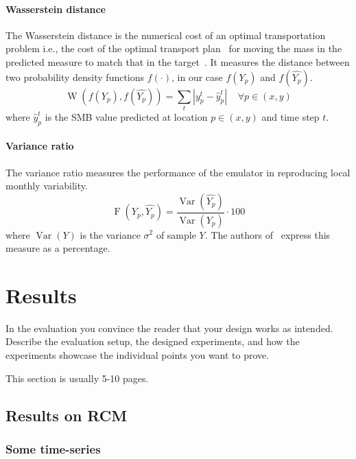 \documentclass[a4paper,11pt,oneside]{report}
\begin{document}
\subsubsection{Wasserstein distance}\label{subsubsec:wasserstein}
The Wasserstein distance is the numerical cost of an optimal transportation problem i.e., the cost of
the optimal transport plan~\cite{villani} for moving the mass in the predicted
measure to match that in the target~\cite{wasserstein1}. It measures the distance between two probability density functions $f(\cdotp)$, in our case $f(Y_p)$ and $f(\widehat{Y_p})$.
\begin{equation}
    \operatorname{W}\left(f(Y_p),f(\widehat{Y_p})\right) = \sum_{t}|y^{t}_{p}-\hat{y}_{p}^{t}| \;\;\;\; \forall p \in (x,y)
\end{equation}
 where $\hat{y}_{p}^{t}$ is the SMB value predicted at location $p\in (x,y)$ and time step $t$.

\subsubsection{Variance ratio}\label{subsubsec:variance-ratio}
 The variance ratio measures the performance of the emulator in reproducing local monthly variability. 
 \begin{equation}
     \operatorname{F}(Y_{p},\widehat{Y_{p}}) = \frac{\operatorname{Var}(\widehat{Y_{p}})}{\operatorname{Var}(Y_{p})}\cdot100
 \end{equation}
 where $\operatorname{Var}(Y)$ is the variance $\sigma^2$ of sample $Y$. The authors of~\cite{Doury} express this measure as a percentage. 



\chapter{Results}

In the evaluation you convince the reader that your design works as intended.
Describe the evaluation setup, the designed experiments, and how the
experiments showcase the individual points you want to prove.

This section is usually 5-10 pages.

\section{Results on RCM}
\subsection{Some time-series}
\end{document}
